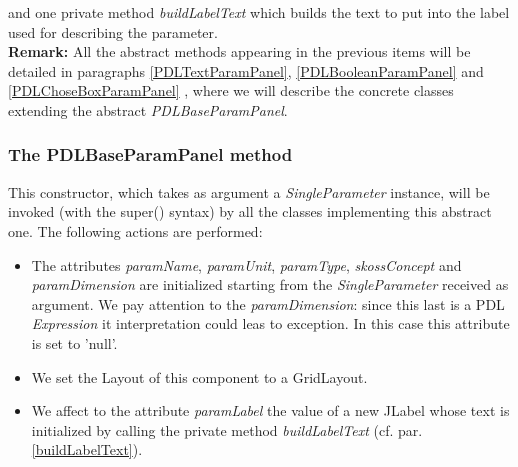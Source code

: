 \documentclass[a4paper,11pt] {ivoa}
\begin{document}
and one private method {\it buildLabelText} which builds the text to put into the label used for describing the parameter.\\
{\bf Remark:} All the abstract methods appearing in the previous items will be detailed in paragraphs \ref{PDLTextParamPanel}, \ref{PDLBooleanParamPanel} and \ref{PDLChoseBoxParamPanel} , where we will describe the concrete classes extending the abstract {\it PDLBaseParamPanel}.

\subsubsection{The PDLBaseParamPanel method}\label{PDLBaseParamPanel}
This constructor, which takes as argument a {\it SingleParameter} instance, will be invoked (with the super() syntax) by all the classes implementing this abstract one. The following actions are performed:
\begin{itemize}
\item The attributes {\it paramName},  {\it paramUnit},  {\it paramType},  {\it skossConcept} and  {\it paramDimension} are initialized starting from the {\it SingleParameter} received as argument. We pay attention to the  {\it paramDimension}: since this last is a PDL {\it Expression} it interpretation could leas to exception. In this case this attribute is set to 'null'.
\item We set the Layout of this component to a GridLayout.
\item We affect to the attribute {\it paramLabel} the value of a new {JLabel} whose text is initialized by calling the private method {\it buildLabelText} (cf. par. \ref{buildLabelText}).
\end{itemize}
\end{document}
